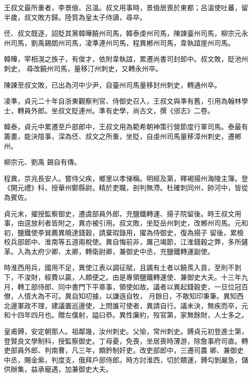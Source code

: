 \begin{pinyinscope}
 王叔文最所重者，李景儉、呂溫。叔文用事時，景儉居喪於東都；呂溫使吐蕃，留半歲，叔文敗方歸。陸質為皇太子侍讀，尋卒。



 伾、叔文既逐，詔貶其黨韓曄饒州司馬，韓泰虔州司馬，陳諫臺州司馬，柳宗元永州司馬，劉禹錫朗州司馬，凌準連州司馬，程異郴州司馬，韋執誼崖州司馬。



 韓曄，宰相滉之族子，有俊才，依附韋執誼，累遷尚書司封郎中。叔文敗，貶池州刺史，
 尋改饒州司馬，量移汀州刺史，又轉永州卒。



 陳諫至叔文敗，已出為河中少尹，自臺州司馬量移封州刺史，轉通州卒。



 凌準，貞元二十年自浙東觀察判官、侍御史召入，王叔文與準有舊，引用為翰林學士，轉員外郎。坐叔文貶連州。準有史學，尚古文，撰《邠志》二卷。



 韓泰，貞元中累遷至戶部郎中，王叔文用為範希朝神策行營節度行軍司馬。泰最有籌畫，能決陰事，深為伾、叔文之所重，坐貶，自虔州司馬量移漳州刺史，遷郴州。



 柳宗元、劉禹
 錫自有傳。



 程異，京兆長安人。嘗侍父疾，鄉里以孝悌稱。明經及第，釋褐揚州海陵主簿。登《開元禮》科，授華州鄭縣尉。精於吏職，剖判無滯。杜確刺同州，帥河中，皆從為賓佐。



 貞元末，擢授監察御史，遷虞部員外郎，充鹽鐵轉運、揚子院留後。時王叔文用事，由逕放利者皆附之，異亦被引用。叔文敗，坐貶岳州刺史，改郴州司馬。元和初，鹽鐵使李巽薦異曉達錢穀，請棄瑕錄用，擢為侍御史，復為揚子
 留後，累檢校兵部郎中、淮南等五道兩稅使。異自悔前非，厲己竭節，江淮錢穀之弊，多所鏟革。入為太府少卿、太卿，轉衛尉卿，兼御史中丞，充鹽鐵轉運副使。



 時淮西用兵，國用不足，異使江表以調征賦，且諷有土者以饒羨入貢，至則不剝下，不浚財，經費以贏，人頗便之。由是專領鹽鐵轉運使、兼御史大夫。十三年九月，轉工部侍郎、同中書門下平章事，領使如故。議者以異起錢穀吏，一旦位冠百僚，人情大為不可。異自知叨據，以謙遜自牧，
 月餘日，不敢知印秉筆。異知西北邊軍政不理，建議置巡邊使，上問誰可使者，異請自行。議未決，無疾而卒，元和十四年四月也。贈左僕射，謚曰恭。異性廉約，歿官第，家無餘財，人士多之。



 皇甫鎛，安定朝那人。祖鄰幾，汝州刺史。父愉，常州刺史。鎛貞元初登進士第，登賢良文學制科，授監察御史。丁母憂，免喪，坐居喪時薄游，除詹事府司直。轉吏部員外郎、判南曹，凡三年，頗鈐制奸吏。改吏部郎中，三遷司農
 卿、兼御史中丞，賜金紫，判度支，俄拜戶部侍郎。時方討淮西，切於饋運，鎛勾剝嚴急，儲供辦集，益承寵遇，加兼御史大夫。




\end{pinyinscope}
